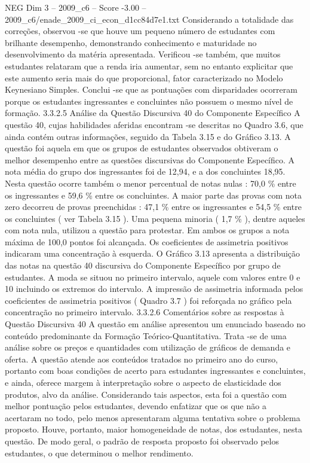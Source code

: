 \begin{textsample}{NEG Dim 3 – 2009\_c6 – Score -3.00 – 2009\_c6/enade\_2009\_ci\_econ\_d1cc84d7e1.txt}
Considerando a totalidade das correções, observou -se que houve um pequeno número de estudantes com brilhante desempenho, demonstrando conhecimento e maturidade no desenvolvimento da matéria apresentada.
Verificou -se também, que muitos estudantes relataram que a renda iria aumentar, sem no entanto explicitar que este aumento seria mais do que proporcional, fator caracterizado no Modelo Keynesiano Simples.
Conclui -se que as pontuações com disparidades ocorreram porque os estudantes ingressantes e concluintes não possuem o mesmo nível de formação. 3.3.2.5 Análise da Questão Discursiva 40 do Componente Específico A questão 40, cujas habilidades aferidas encontram -se descritas no Quadro 3.6, que ainda contém outras informações, seguido da Tabela 3.15 e do Gráfico 3.13.
A questão foi aquela em que os grupos de estudantes observados obtiveram o melhor desempenho entre as questões discursivas do Componente Específico.
A nota média do grupo dos ingressantes foi de 12,94, e a dos concluintes 18,95.
Nesta questão ocorre também o menor percentual de notas nulas : 70,0 \% entre os ingressantes e 59,6 \% entre os concluintes.
A maior parte das provas com nota zero decorreu de provas preenchidas : 47,1 \% entre os ingressantes e 54,5 \% entre os concluintes ( ver Tabela 3.15 ).
Uma pequena minoria ( 1,7 \% ), dentre aqueles com nota nula, utilizou a questão para protestar.
Em ambos os grupos a nota máxima de 100,0 pontos foi alcançada.
Os coeficientes de assimetria positivos indicaram uma concentração à esquerda.
O Gráfico 3.13 apresenta a distribuição das notas na questão 40 discursiva do Componente Específico por grupo de estudantes.
A moda se situou no primeiro intervalo, aquele com valores entre 0 e 10 incluindo os extremos do intervalo.
A impressão de assimetria informada pelos coeficientes de assimetria positivos ( Quadro 3.7 ) foi reforçada no gráfico pela concentração no primeiro intervalo. 3.3.2.6 Comentários sobre as respostas à Questão Discursiva 40 A questão em análise apresentou um enunciado baseado no conteúdo predominante da Formação Teórico-Quantitativa.
Trata -se de uma análise sobre os preços e quantidades com utilização de gráficos de demanda e oferta.
A questão atende aos conteúdos tratados no primeiro ano do curso, portanto com boas condições de acerto para estudantes ingressantes e concluintes, e ainda, oferece margem à interpretação sobre o aspecto de elasticidade dos produtos, alvo da análise.
Considerando tais aspectos, esta foi a questão com melhor pontuação pelos estudantes, devendo enfatizar que os que não a acertaram no todo, pelo menos apresentaram alguma tentativa sobre o problema proposto.
Houve, portanto, maior homogeneidade de notas, dos estudantes, nesta questão.
De modo geral, o padrão de resposta proposto foi observado pelos estudantes, o que determinou o melhor rendimento.

\end{textsample}
